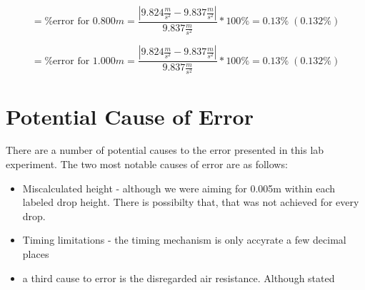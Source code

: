 \begin{equation*}
  = \text{\%error for 0.800$m$} = \frac{|9.824\frac{m}{s^2} - 9.837\frac{m}{s^2}|}{9.837\frac{m}{s^2}} * 100\% = 0.13\% \; (0.132\%)
\end{equation*}

\begin{equation*}
  = \text{\%error for 1.000$m$} = \frac{|9.824\frac{m}{s^2} - 9.837\frac{m}{s^2}|}{9.837\frac{m}{s^2}} * 100\% = 0.13\% \; (0.132\%)
\end{equation*}

\section{Potential Cause of Error}
There are a number of potential causes to the error presented in this lab 
experiment. The two most notable causes of error are as follows:
\begin{itemize}
  \item Miscalculated height - although we were aiming for 0.005m within each labeled
    drop height. There is possibilty that, that was not achieved for every drop.
  \item Timing limitations - the timing mechanism is only accyrate a few decimal places
  \item a third cause to error is the disregarded air resistance. Although stated 
\end{itemize}
    
